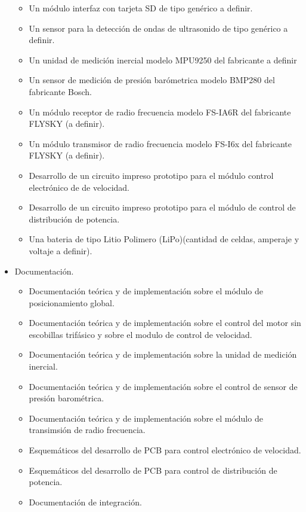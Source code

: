 \documentclass[
11pt, %
]{charter}
\begin{document}
\begin{itemize}
\begin{itemize}
			      \item Un m\'odulo interfaz con tarjeta SD de tipo gen\'erico a definir.
			      \item Un sensor para la detecci\'on de ondas de ultrasonido de tipo gen\'erico a definir.
			      \item Un unidad de medici\'on inercial modelo MPU9250 del fabricante a definir
			      \item Un sensor de medici\'on de presi\'on bar\'ometrica modelo BMP280 del fabricante Bosch.
			      \item Un m\'odulo receptor de radio frecuencia modelo FS-IA6R del fabricante FLYSKY (a definir). 
			      \item Un m\'odulo transmisor de radio frecuencia modelo FS-I6x del fabricante FLYSKY (a definir).
				  \item	Desarrollo de un circuito impreso prototipo para el m\'odulo control electr\'onico de de velocidad.
			      \item Desarrollo de un circuito impreso prototipo para el m\'odulo de control de distribuci\'on de potencia.
			      \item Una bateria de tipo Litio Polimero (LiPo)(cantidad de celdas, amperaje y voltaje a definir).
		      \end{itemize}
		\item Documentaci\'on.
		      \begin{itemize}
			      \item Documentaci\'on te\'orica y de implementaci\'on sobre el m\'odulo de posicionamiento global.
			      \item Documentaci\'on te\'orica y de implementaci\'on sobre el control del motor sin escobillas trif\'asico y sobre el modulo de control de velocidad.
			      \item Documentaci\'on te\'orica y de implementaci\'on sobre la unidad de medici\'on inercial.
			      \item Documentaci\'on te\'orica y de implementaci\'on sobre el control de sensor de presi\'on barom\'etrica.
			      \item Documentaci\'on te\'orica y de implementaci\'on sobre el m\'odulo de transimsi\'on de radio frecuencia.
			      \item Esquem\'aticos del desarrollo de PCB para control electr\'onico de velocidad.
			      \item Esquem\'aticos del desarrollo de PCB para control de distribuci\'on de potencia.
			      \item Documentaci\'on de integraci\'on.
		      \end{itemize}

	\end{itemize}
	
\end{document}
